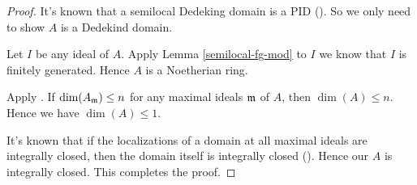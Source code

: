 \begin{proof}
\leanok
It's known that a semilocal Dedeking domain is a PID
().
So we only need to show $A$ is a Dedekind domain.

Let $I$ be any ideal of $A$. Apply Lemma \ref{semilocal-fg-mod} to $I$ we know that
$I$ is finitely generated. Hence $A$ is a Noetherian ring.

Apply . If $\dim(A_{{\mathfrak{m}}}) \le n$ for any maximal ideals ${\mathfrak{m}}$ of $A$,
then $\dim(A) \le n$. Hence we have $\dim(A) \le 1$.

It's known that if the localizations of a domain at all maximal ideals
are integrally closed, then the domain itself is integrally closed
().
Hence our $A$ is integrally closed. This completes the proof.
\end{proof}

